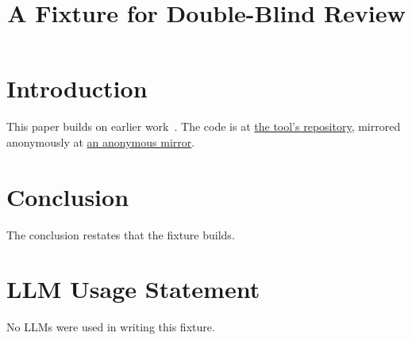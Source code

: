 \documentclass[conference,compsoc]{IEEEtran}
\begin{document}
\title{A Fixture for Double-Blind Review}
\author{}
\maketitle
\section{Introduction}
This paper builds on earlier work~\cite{knuth84}.
The code is at \href{https://github.com/adaexample/tool}{the tool's repository}, mirrored anonymously at \href{https://anonymous.4open.science/r/tool-1A2B}{an anonymous mirror}.
\section{Conclusion}
The conclusion restates that the fixture builds.


\section*{LLM Usage Statement}
No LLMs were used in writing this fixture.
\end{document}
